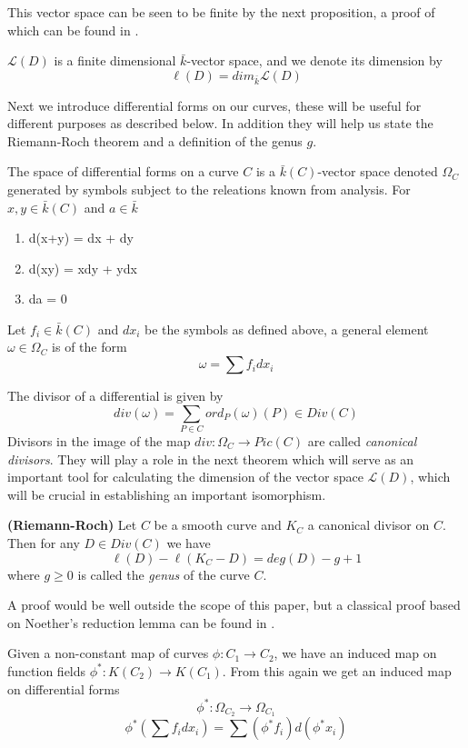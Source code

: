 This vector space can be seen to be finite by the next proposition, a proof of
which can be found in \cite{Fulton}.

\begin{prop}
 $\mathscr{L}(D)$ is a finite dimensional $\bar{k}$-vector space, and we denote
its dimension by
$$ \ell(D) = dim_{\bar{k}} \mathscr{L}(D) $$
\end{prop}

Next we introduce differential forms on our curves, these will be useful for different purposes
as described below. In addition they will help us state the Riemann-Roch theorem and a definition
of the genus $g$.

\begin{mydef}
 The space of differential forms on a curve $C$ is a $\bar{k}(C)$-vector space denoted $\Omega_C$
generated by symbols subject to the releations known from analysis. 
For $x, y \in \bar{k}(C)$ and $a \in \bar{k}$
\begin{enumerate}
  \item d(x+y) = dx + dy
  \item d(xy) = xdy + ydx
  \item da = 0
\end{enumerate}
Let $f_i \in \bar{k}(C)$ and $dx_i$ be the symbols as defined above, a general
element $\omega \in \Omega_C$ is of the form
$$ \omega = \sum f_i dx_i $$
\end{mydef}

The divisor of a differential is given by
$$ div(\omega) = \sum_{P\in C} ord_P(\omega)(P) \in Div(C)$$
Divisors in the image of the map $div: \Omega_C \rightarrow Pic(C)$ are called
\emph{canonical divisors}. They will play a role in the next theorem which will
serve as an important tool for calculating the dimension of the vector space
$\mathscr{L}(D)$, which will be crucial in establishing an important isomorphism.

\begin{thm}
 \textbf{(Riemann-Roch)}
  Let $C$ be a smooth curve and $K_C$ a canonical divisor on $C$. Then for
any $D \in Div(C)$ we have
$$ \ell(D) - \ell(K_C - D) = deg(D) - g + 1 $$
where $g \geq 0$ is called the \emph{genus} of the curve $C$.
\end{thm}

 A proof would be well outside the scope of this paper, but a classical proof based
on Noether's reduction lemma can be found in \cite{Fulton}. 

Given a non-constant map of curves $\phi: C_1 \rightarrow C_2$, we have an induced map
on function fields $\phi^*: K(C_2) \rightarrow K(C_1)$. From this again we get an induced
map on differential forms
$$ \phi^*: \Omega_{C_2} \rightarrow \Omega_{C_1} $$
$$ \phi^*\left(\sum f_i dx_i\right) = \sum (\phi^* f_i) d(\phi^* x_i) $$
\label{diff}

